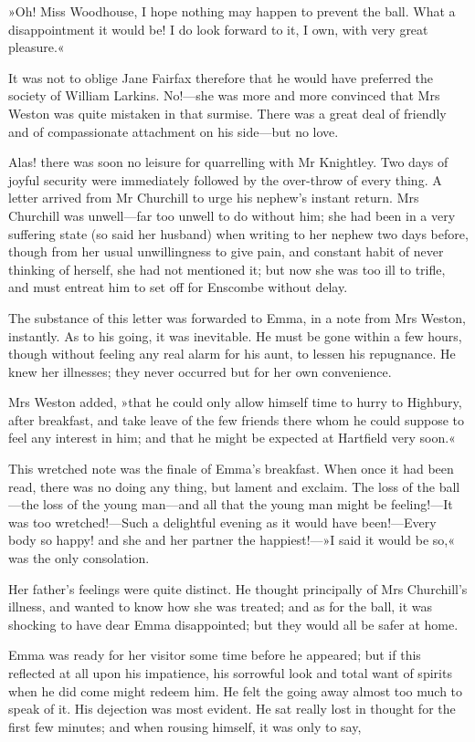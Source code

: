»Oh! Miss Woodhouse, I hope nothing may happen to prevent the ball. What a disappointment it would be! I do look forward to it, I own, with very great pleasure.«

It was not to oblige Jane Fairfax therefore that he would have preferred the society of William Larkins. No!—she was more and more convinced that Mrs Weston was quite mistaken in that surmise. There was a great deal of friendly and of compassionate attachment on his side—but no love.

Alas! there was soon no leisure for quarrelling with Mr Knightley. Two days of joyful security were immediately followed by the over-throw of every thing. A letter arrived from Mr Churchill to urge his nephew's instant return. Mrs Churchill was unwell—far too unwell to do without him; she had been in a very suffering state (so said her husband) when writing to her nephew two days before, though from her usual unwillingness to give pain, and constant habit of never thinking of herself, she had not mentioned it; but now she was too ill to trifle, and must entreat him to set off for Enscombe without delay.

The substance of this letter was forwarded to Emma, in a note from Mrs Weston, instantly. As to his going, it was inevitable. He must be gone within a few hours, though without feeling any real alarm for his aunt, to lessen his repugnance. He knew her illnesses; they never occurred but for her own convenience.

Mrs Weston added, »that he could only allow himself time to hurry to Highbury, after breakfast, and take leave of the few friends there whom he could suppose to feel any interest in him; and that he might be expected at Hartfield very soon.«

This wretched note was the finale of Emma's breakfast. When once it had been read, there was no doing any thing, but lament and exclaim. The loss of the ball—the loss of the young man—and all that the young man might be feeling!—It was too wretched!—Such a delightful evening as it would have been!—Every body so happy! and she and her partner the happiest!—»I said it would be so,« was the only consolation.

Her father's feelings were quite distinct. He thought principally of Mrs Churchill's illness, and wanted to know how she was treated; and as for the ball, it was shocking to have dear Emma disappointed; but they would all be safer at home.

Emma was ready for her visitor some time before he appeared; but if this reflected at all upon his impatience, his sorrowful look and total want of spirits when he did come might redeem him. He felt the going away almost too much to speak of it. His dejection was most evident. He sat really lost in thought for the first few minutes; and when rousing himself, it was only to say,

